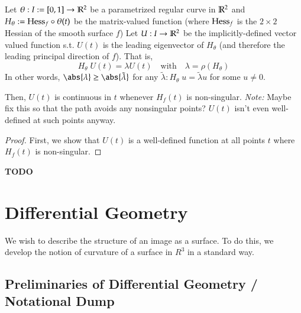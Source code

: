         \begin{theorem}
            Let $\theta: I:= [0,1] \to \mathbb{R}^2$ be a parametrized regular curve in $\mathbb{R}^2$ and
            $H_\theta := \mathrm{Hess}_f  \circ \theta(t)$ be the matrix-valued function
            (where $\mathrm{Hess}_f$ is the $2\times 2$ Hessian of the smooth surface $f$)
            Let $U:I \to \mathbb{R}^2$ be the implicitly-defined vector valued function s.t.
            $U(t)$ is the leading eigenvector of $H_\theta$
            (and therefore the leading principal direction of $f$). That is,
            \begin{equation}
                H_\theta \; U(t) = \lambda U(t) \quad \textrm{with}\quad \lambda = \rho(H_\theta)
            \end{equation}
            In other words, $\abs{\lambda} \ge \abs{\tilde{\lambda}}$ for any
            $\tilde{\lambda} : H_\theta \; u = \tilde{\lambda} u$ for some $u \ne 0$.
            
            Then, $U(t)$ is continuous in $t$ whenever $H_f(t)$ is non-singular.
            \textit{Note:} Maybe fix this so that the path avoids any nonsingular points?
            $U(t)$ isn't even well-defined at such points anyway.
        \end{theorem}
        \begin{proof}
            First, we show that $U(t)$ is a well-defined function at all points $t$ where
            $H_f(t)$ is non-singular.
        \end{proof}

         \maltese \textbf{TODO}       

\hrulefill

\section{Differential Geometry}


We wish to describe the structure of an image as a surface. To do this, we develop the notion of curvature of a surface in $R^3$ in a standard way. 
        \subsection{Preliminaries of Differential Geometry / Notational Dump}
        
